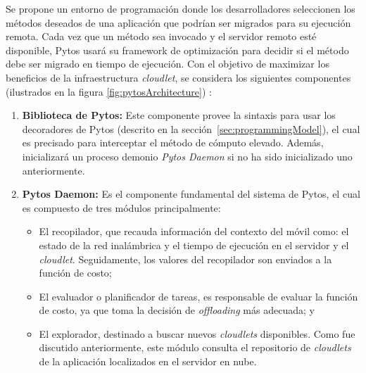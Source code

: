 Se propone un entorno de programación donde los desarrolladores seleccionen los métodos deseados de una aplicación que podrían ser migrados para
su ejecución remota. Cada vez que un método sea invocado y el servidor remoto esté disponible, Pytos usará su framework de optimización para decidir 
si el método debe ser migrado en tiempo de ejecución.
Con el objetivo de maximizar los beneficios de la infraestructura \textit{cloudlet}, se considera los siguientes componentes (ilustrados en la 
figura \ref{fig:pytosArchitecture}) : 

\begin{enumerate}
 \item \textbf{Biblioteca de Pytos:} Este componente provee la sintaxis para usar los decoradores de Pytos (descrito en la sección~\ref{sec:programmingModel}), el cual es precisado para interceptar
 el método de cómputo elevado. Además, inicializará un proceso demonio \textit{Pytos Daemon} si no ha sido inicializado uno anteriormente.
 \item \textbf{Pytos Daemon:} Es el componente fundamental del sistema de Pytos, el cual es compuesto de tres módulos principalmente:
 \begin{itemize}
\item El recopilador, que recauda información del contexto del móvil como: el estado de la red inalámbrica y el tiempo de ejecución en el servidor 
y el \textit{cloudlet}. Seguidamente, los valores del recopilador son enviados a la función de costo;
\item El evaluador o planificador de tareas, es responsable de evaluar la función de costo, ya que toma la decisión de \textit{offloading} más adecuada; y 
\item El explorador,  destinado a buscar nuevos \textit{cloudlets} disponibles. Como fue discutido anteriormente, este módulo consulta el repositorio
de \textit{cloudlets} de la aplicación localizados en el servidor en nube. 


\end{itemize}
\end{enumerate}
